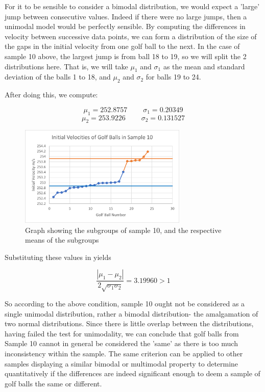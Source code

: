 \documentclass[11pt]{article}
\begin{document}
For it to be sensible to consider a bimodal distribution, we would expect a 'large' jump between consecutive values. Indeed if there were no large jumps, then a unimodal model would be perfectly sensible. By computing the differences in velocity between successive data points, we can form a distribution of the size of the gaps in the initial velocity from one golf ball to the next. In the case of sample 10 above, the largest jump is from ball 18 to 19, so we will split the 2 distributions here. That is, we will take $\mu_1$ and $\sigma_1$ as the mean and standard deviation of the balls 1 to 18, and $\mu_2$ and $\sigma_2$ for balls 19 to 24.


After doing this, we compute:

$$\mu_1=252.8757\;\;\;\;\;\;\;\;\sigma_1=0.20349$$
$$\mu_2=253.9226\;\;\;\;\;\;\;\;\sigma_2=0.131527$$


\begin{figure}[H]
    \centering
    \includegraphics[width=80mm]{Sample10bimodal.png}
    \caption{Graph showing the subgroups of sample 10, and the respective means of the subgroups}
    \label{figure 9}
\end{figure}


Substituting these values in yields

$$\frac{|\mu_1-\mu_2|}{2\sqrt{\sigma_1\sigma_2}}=3.19960>1$$

So according to the above condition, sample 10 ought not be considered as a single unimodal distribution, rather a bimodal distribution- the amalgamation of two normal distributions. Since there is little overlap between the distributions, having failed the test for unimodality, we can conclude that golf balls from Sample 10 cannot in general be considered the 'same' as there is too much inconsistency within the sample. The same criterion can be applied to other samples displaying a similar bimodal or multimodal property to determine quantitatively if the differences are indeed significant enough to deem a sample of golf balls the same or different.
\end{document}
